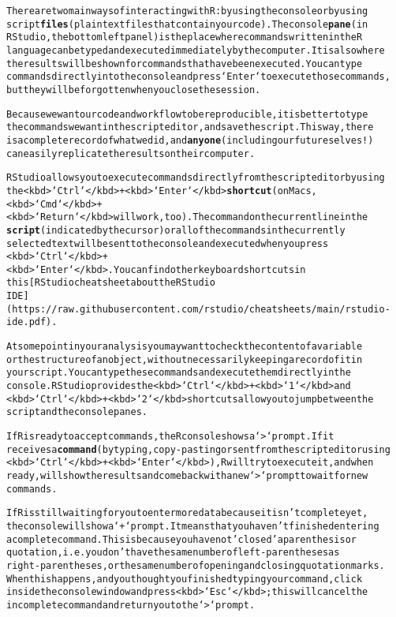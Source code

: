 \documentclass{article}\usepackage[]{graphicx}\usepackage[]{xcolor}
\makeatletter
\newcommand{\hlstr}[1]{\textcolor[rgb]{0.192,0.494,0.8}{#1}}%
\newcommand{\hlkwd}[1]{\textcolor[rgb]{0.737,0.353,0.396}{\textbf{#1}}}%
\newenvironment{kframe}{%
 \def\at@end@of@kframe{}%
 \ifinner\ifhmode%
  \def\at@end@of@kframe{\end{minipage}}%
  \begin{minipage}{\columnwidth}%
 \fi\fi%
 \def\FrameCommand##1{\hskip\@totalleftmargin \hskip-\fboxsep
 \colorbox{shadecolor}{##1}\hskip-\fboxsep
     \hskip-\linewidth \hskip-\@totalleftmargin \hskip\columnwidth}%
 \MakeFramed {\advance\hsize-\width
   \@totalleftmargin\z@ \linewidth\hsize
   \@setminipage}}%
 {\par\unskip\endMakeFramed%
 \at@end@of@kframe}
\newenvironment{knitrout}{}{} %
\makeatother
\begin{document}
\begin{knitrout}
\begin{kframe}
\begin{alltt}
There are two main ways of interacting with R: by using the console or by using
script \hlkwd{files} (plain text files that contain your code). The console \hlkwd{pane} (in
RStudio, the bottom left panel) is the place where commands written in the R
language can be typed and executed immediately by the computer. It is also where
the results will be shown for commands that have been executed. You can type
commands directly into the console and press `Enter` to execute those commands,
but they will be forgotten when you close the session.

Because we want our code and workflow to be reproducible, it is better to type
the commands we want in the script editor, and save the script. This way, there
is a complete record of what we did, and \hlkwd{anyone} (including our future selves!)
can easily replicate the results on their computer.

RStudio allows you to execute commands directly from the script editor by using
the <kbd>`Ctrl`</kbd> + <kbd>`Enter`</kbd> \hlkwd{shortcut} (on Macs, <kbd>`Cmd`</kbd> +
<kbd>`Return`</kbd> will work, too). The command on the current line in the
\hlkwd{script} (indicated by the cursor) or all of the commands in the currently
selected text will be sent to the console and executed when you press
<kbd>`Ctrl`</kbd> + <kbd>`Enter`</kbd>. You can find other keyboard shortcuts in
this [RStudio cheatsheet about the RStudio
IDE](https://raw.githubusercontent.com/rstudio/cheatsheets/main/rstudio-ide.pdf).

At some point in your analysis you may want to check the content of a variable
or the structure of an object, without necessarily keeping a record of it in
your script. You can type these commands and execute them directly in the
console. RStudio provides the <kbd>`Ctrl`</kbd> + <kbd>`1`</kbd> and
<kbd>`Ctrl`</kbd> + <kbd>`2`</kbd> shortcuts allow you to jump between the
script and the console panes.

If R is ready to accept commands, the R console shows a `>` prompt. If it
receives a \hlkwd{command} (by typing, copy-pasting or sent from the script editor using
<kbd>`Ctrl`</kbd> + <kbd>`Enter`</kbd>), R will try to execute it, and when
ready, will show the results and come back with a new `>` prompt to wait for new
commands.

If R is still waiting for you to enter more data because it isn't complete yet,
the console will show a `+` prompt. It means that you haven't finished entering
a complete command. This is because you have not \hlstr{'closed'} a parenthesis or
quotation, i.e. you don't have the same number of left-parentheses as
right-parentheses, or the same number of opening and closing quotation marks.
When this happens, and you thought you finished typing your command, click
inside the console window and press <kbd>`Esc`</kbd>; this will cancel the
incomplete command and return you to the `>` prompt.


\end{alltt}
\end{kframe}
\end{knitrout}
\end{document}
